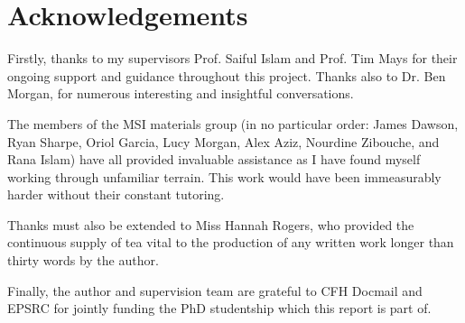 \section*{Acknowledgements}
\thispagestyle{plain}
Firstly, thanks to my supervisors Prof. Saiful Islam and Prof. Tim Mays for their ongoing support and guidance throughout this project.
Thanks also to Dr. Ben Morgan, for numerous interesting and insightful conversations.

The members of the MSI materials group (in no particular order: James Dawson, Ryan Sharpe, Oriol Garcia, Lucy Morgan, Alex Aziz, Nourdine Zibouche, and Rana Islam) have all provided invaluable assistance as I have found myself working through unfamiliar terrain. 
This work would have been immeasurably harder without their constant tutoring.

Thanks must also be extended to Miss Hannah Rogers, who provided the continuous supply of tea vital to the production of any written work longer than thirty words by the author.

Finally, the author and supervision team are grateful to CFH Docmail and EPSRC for jointly funding the PhD studentship which this report is part of.